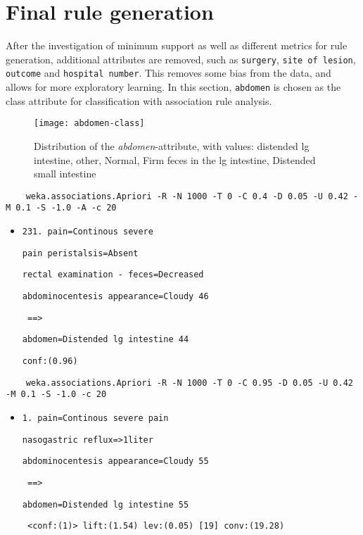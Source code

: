 \section{Final rule generation} \label{sec: rule gen}
After the investigation of minimum support as well as different metrics for rule generation, additional attributes are removed, such as \verb|surgery|, \verb|site of lesion|, \verb|outcome| and \verb|hospital number|. This removes some bias from the data, and allows for more exploratory learning. In this section, \verb|abdomen| is chosen as the class attribute for classification with association rule analysis.

\begin{figure}[H]
\centering
\texttt{[image: abdomen-class]}
\caption{Distribution of the \textit{abdomen}-attribute, with values: distended lg intestine, other, Normal, Firm feces in the lg intestine, Distended small intestine}
\end{figure}

\begin{verbatim}
	weka.associations.Apriori -R -N 1000 -T 0 -C 0.4 -D 0.05 -U 0.42 -M 0.1 -S -1.0 -A -c 20
\end{verbatim}
\begin{itemize}
\item \verb|231. pain=Continous severe|

\verb|pain peristalsis=Absent |

\verb|rectal examination - feces=Decreased |

\verb|abdominocentesis appearance=Cloudy 46|
 
\verb| ==> |

\verb|abdomen=Distended lg intestine 44   |

\verb|conf:(0.96)|
\end{itemize}
\begin{verbatim}
	weka.associations.Apriori -R -N 1000 -T 0 -C 0.95 -D 0.05 -U 0.42 -M 0.1 -S -1.0 -c 20
\end{verbatim}
\begin{itemize}
\item \verb|1. pain=Continous severe pain|

\verb|nasogastric reflux=>1liter |

\verb|abdominocentesis appearance=Cloudy 55|

 \verb| ==> |
 
 \verb|abdomen=Distended lg intestine 55 |

 \verb| <conf:(1)> lift:(1.54) lev:(0.05) [19] conv:(19.28)|
\end{itemize}


